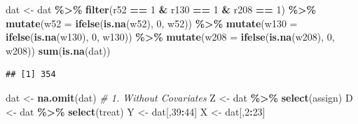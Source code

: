 \documentclass[]{article}
\newenvironment{Shaded}{\begin{snugshade}}{\end{snugshade}}
\newcommand{\KeywordTok}[1]{\textcolor[rgb]{0.13,0.29,0.53}{\textbf{#1}}}
\newcommand{\DataTypeTok}[1]{\textcolor[rgb]{0.13,0.29,0.53}{#1}}
\newcommand{\DecValTok}[1]{\textcolor[rgb]{0.00,0.00,0.81}{#1}}
\newcommand{\StringTok}[1]{\textcolor[rgb]{0.31,0.60,0.02}{#1}}
\newcommand{\CommentTok}[1]{\textcolor[rgb]{0.56,0.35,0.01}{\textit{#1}}}
\newcommand{\OperatorTok}[1]{\textcolor[rgb]{0.81,0.36,0.00}{\textbf{#1}}}
\newcommand{\NormalTok}[1]{#1}
\begin{document}
\begin{Shaded}
\begin{Highlighting}[]
\NormalTok{dat <-}\StringTok{ }\NormalTok{dat }\OperatorTok{\%>\%}
\StringTok{  }\KeywordTok{filter}\NormalTok{(r52 }\OperatorTok{==}\StringTok{ }\DecValTok{1} \OperatorTok{&}\StringTok{ }\NormalTok{r130 }\OperatorTok{==}\StringTok{ }\DecValTok{1} \OperatorTok{&}\StringTok{ }\NormalTok{r208 }\OperatorTok{==}\StringTok{ }\DecValTok{1}\NormalTok{) }\OperatorTok{\%>\%}
\StringTok{  }\KeywordTok{mutate}\NormalTok{(}\DataTypeTok{w52 =} \KeywordTok{ifelse}\NormalTok{(}\KeywordTok{is.na}\NormalTok{(w52), }\DecValTok{0}\NormalTok{, w52)) }\OperatorTok{\%>\%}
\StringTok{  }\KeywordTok{mutate}\NormalTok{(}\DataTypeTok{w130 =} \KeywordTok{ifelse}\NormalTok{(}\KeywordTok{is.na}\NormalTok{(w130), }\DecValTok{0}\NormalTok{, w130)) }\OperatorTok{\%>\%}
\StringTok{  }\KeywordTok{mutate}\NormalTok{(}\DataTypeTok{w208 =} \KeywordTok{ifelse}\NormalTok{(}\KeywordTok{is.na}\NormalTok{(w208), }\DecValTok{0}\NormalTok{, w208))}
\KeywordTok{sum}\NormalTok{(}\KeywordTok{is.na}\NormalTok{(dat))}
\end{Highlighting}
\end{Shaded}

\begin{verbatim}
## [1] 354
\end{verbatim}

\begin{Shaded}
\begin{Highlighting}[]
\NormalTok{dat <-}\StringTok{ }\KeywordTok{na.omit}\NormalTok{(dat)}
\CommentTok{# 1. Without Covariates}
\NormalTok{Z <-}\StringTok{ }\NormalTok{dat }\OperatorTok{\%>\%}
\StringTok{  }\KeywordTok{select}\NormalTok{(assign)}
\NormalTok{D <-}\StringTok{ }\NormalTok{dat }\OperatorTok{\%>\%}
\StringTok{  }\KeywordTok{select}\NormalTok{(treat)}
\NormalTok{Y <-}\StringTok{ }\NormalTok{dat[,}\DecValTok{39}\OperatorTok{:}\DecValTok{44}\NormalTok{]}
\NormalTok{X <-}\StringTok{ }\NormalTok{dat[,}\DecValTok{2}\OperatorTok{:}\DecValTok{23}\NormalTok{]}
\end{Highlighting}
\end{Shaded}
\end{document}
